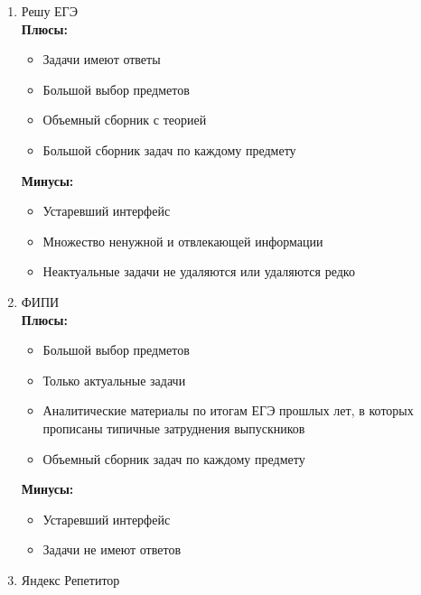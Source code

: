 \documentclass[a4paper, 12pt]{extarticle}
\begin{document}
\begin{enumerate}
    \item{\large Решу ЕГЭ}
    \vspace{2mm}
    \\
    \textbf{Плюсы:}
    \vspace{-2mm}
    \begin{itemize}
        \item Задачи имеют ответы
        \item Большой выбор предметов
        \item Объемный сборник с теорией
        \item Большой сборник задач по каждому предмету
    \end{itemize}
    \textbf{Минусы:}
    \vspace{-2mm}
    \begin{itemize}
        \item Устаревший интерфейс
        \item Множество ненужной и отвлекающей информации
        \item Неактуальные задачи не удаляются или удаляются редко
    \end{itemize}
    \vspace{2mm}
    \item{\large ФИПИ}
    \vspace{2mm}
    \\
    \textbf{Плюсы:}
    \vspace{-2mm}
    \begin{itemize}
        \item Большой выбор предметов
        \item Только актуальные задачи
        \item Аналитические материалы по итогам ЕГЭ прошлых лет, в которых
            прописаны типичные затруднения выпускников
        \item Объемный сборник задач по каждому предмету
    \end{itemize}
    \textbf{Минусы:}
    \vspace{-2mm}
    \begin{itemize}
        \item Устаревший интерфейс
        \item Задачи не имеют ответов
    \end{itemize}
    \newpage
    \item{\large Яндекс Репетитор}
    \vspace{2mm}
    \\

\end{enumerate}
\end{document}

